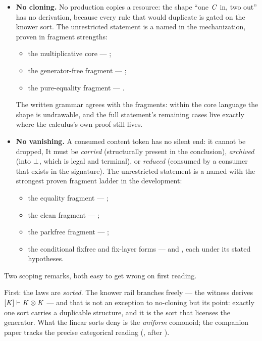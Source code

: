 \documentclass{eptcs}
\begin{document}
\begin{itemize}
\item \textbf{No cloning.} No production copies a resource: the shape ``one $\mathit{C}$ in, two out'' has no derivation, because every rule that would duplicate is gated on the knower sort. The unrestricted statement
 is a named \conjl{} in the
mechanization, proven in fragment strengths:
\begin{itemize}
\item the multiplicative core --- 
  ;
\item the generator-free fragment ---
   ;
\item the pure-equality fragment ---
   .
\end{itemize}
The written grammar agrees with the fragments: within the core language
the shape is undrawable, and the full statement's remaining cases live
exactly where the calculus's own proof still lives.
\item \textbf{No vanishing.} A consumed content token has no silent end: it cannot be dropped, It must be \emph{carried} (structurally present in the
conclusion), \emph{archived} (into $\bot$, which is legal and terminal),
or \emph{reduced} (consumed by a consumer that exists in the signature).
The unrestricted statement  is a named
\conjl{} with the strongest proven fragment ladder in the development:
\begin{itemize}
\item the equality fragment --- 
  ;
\item the clean fragment --- 
  ;
\item the parkfree fragment --- 
  ;
\item the conditional fixfree and fix-layer forms ---
   and
   ,
  each under its stated hypotheses.
\end{itemize}
\end{itemize}

Two scoping remarks, both easy to get wrong on first reading.

First: the laws are \emph{sorted}. The knower rail branches freely --- the
witness  derives
$[\mathit{K}] \vdash \mathit{K} \otimes \mathit{K}$  --- and that is not an
exception to no-cloning but its point: exactly one sort carries a
duplicable structure, and it is the sort that licenses the generator. What
the linear sorts deny is the \emph{uniform} comonoid; the companion paper
tracks the precise categorical reading
(\cite{dcarecompanion}, after \cite{abramsky2004}).
\end{document}

